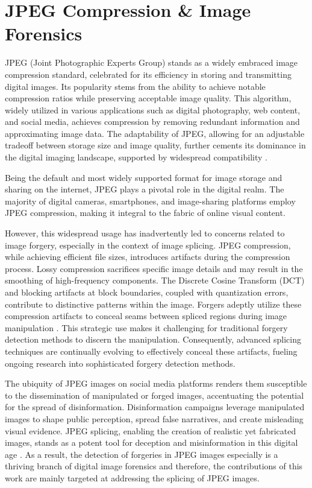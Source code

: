   \section{JPEG Compression \& Image Forensics } \label{sec:s3}


JPEG (Joint Photographic Experts Group) stands as a widely embraced image compression standard, celebrated for its efficiency in storing and transmitting digital images. Its popularity stems from the ability to achieve notable compression ratios while preserving acceptable image quality. \cite{wallace1992jpeg} This algorithm, widely utilized in various applications such as digital photography, web content, and social media, achieves compression by removing redundant information and approximating image data. The adaptability of JPEG, allowing for an adjustable tradeoff between storage size and image quality, further cements its dominance in the digital imaging landscape, supported by widespread compatibility \cite{palmer2013rhetoric}.

Being the default and most widely supported format for image storage and sharing on the internet, JPEG plays a pivotal role in the digital realm. The majority of digital cameras, smartphones, and image-sharing platforms employ JPEG compression, making it integral to the fabric of online visual content.

However, this widespread usage has inadvertently led to concerns related to image forgery, especially in the context of image splicing. JPEG compression, while achieving efficient file sizes, introduces artifacts during the compression process. Lossy compression sacrifices specific image details and may result in the smoothing of high-frequency components. The Discrete Cosine Transform (DCT) and blocking artifacts at block boundaries, coupled with quantization errors, contribute to distinctive patterns within the image. Forgers adeptly utilize these compression artifacts to conceal seams between spliced regions during image manipulation \cite{Ma_Jiang_Fan_Jiang_Yan_2020}. This strategic use makes it challenging for traditional forgery detection methods to discern the manipulation. Consequently, advanced splicing techniques are continually evolving to effectively conceal these artifacts, fueling ongoing research into sophisticated forgery detection methods.

The ubiquity of JPEG images on social media platforms renders them susceptible to the dissemination of manipulated or forged images, accentuating the potential for the spread of disinformation. Disinformation campaigns leverage manipulated images to shape public perception, spread false narratives, and create misleading visual evidence. JPEG splicing, enabling the creation of realistic yet fabricated images, stands as a potent tool for deception and misinformation in this digital age \cite{huh2018fighting}. As a result, the detection of forgeries in JPEG images especially is a thriving branch of digital image forensics and therefore, the contributions of this work are mainly targeted at addressing the splicing of JPEG images.


